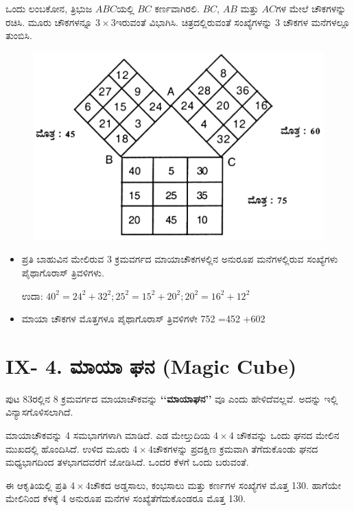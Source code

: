 ಒಂದು ಲಂಬಕೋನ, ತ್ರಿಭುಜ $ABC$ಯಲ್ಲಿ $BC$ ಕರ್ಣವಾಗಿರಲಿ. $BC$, $AB$ ಮತ್ತು $AC$ಗಳ ಮೇಲೆ ಚೌಕಗಳನ್ನು ರಚಿಸಿ. ಮೂರು ಚೌಕಗಳನ್ನೂ $3 \times 3$ಇರುವಂತೆ ವಿಭಾಗಿಸಿ. ಚಿತ್ರದಲ್ಲಿರುವಂತೆ ಸಂಖ್ಯೆಗಳನ್ನು 3 ಚೌಕಗಳ ಮನೆಗಳಲ್ಲೂ ತುಂಬಿಸಿ.
\begin{figure}[H]
\includegraphics{src/figures/chap8/fig8.10.jpg}
\end{figure}
\begin{itemize}
	\item ಪ್ರತಿ ಬಾಹುವಿನ ಮೇಲಿರುವ 3 ಕ್ರಮವರ್ಗದ ಮಾಯಾಚೌಕಗಳಲ್ಲಿನ ಅನುರೂಪ ಮನೆಗಳಲ್ಲಿರುವ ಸಂಖ್ಯೆಗಳು ಪೈಥಾಗೊರಾಸ್ ತ್ರಿವಳಿಗಳು.

	ಉದಾ: $40^2 = 24^2 +32^2 ; 25^2 =15^2 +20^2 ; 20^2 =16^2+12^2$
	\item ಮಾಯಾ ಚೌಕಗಳ ಮೊತ್ತಗಳೂ ಪೈಥಾಗೊರಾಸ್ ತ್ರಿವಳಿಗಳೇ 752 =452 +602
\end{itemize}

\section*{IX- 4. ಮಾಯಾ ಘನ (Magic Cube)}

ಪುಟ 83ರಲ್ಲಿನ 8 ಕ್ರಮವರ್ಗದ ಮಾಯಾಚೌಕವನ್ನು \textbf{‘‘ಮಾಯಾಘನ’’} ವೂ ಎಂದು ಹೇಳಿದೆವಲ್ಲವೆ. ಅದನ್ನು ಇಲ್ಲಿ ವಿನ್ಯಾಸಗೊಳಿಸಲಾಗಿದೆ.

ಮಾಯಾಚೌಕವನ್ನು 4 ಸಮಭಾಗಗಳಾಗಿ ಮಾಡಿದೆ. ಎಡ ಮೇಲ್ತುದಿಯ $4 \times 4$ ಚೌಕ\-ವನ್ನು ಒಂದು ಘನದ ಮೇಲಿನ ಮುಖದಲ್ಲಿ ಹೊಂದಿಸಿದೆ. ಉಳಿದ ಮೂರು $4 \times 4$\break ಚೌಕಗಳನ್ನು ಪ್ರದಕ್ಷಿಣ ಕ್ರಮವಾಗಿ ತೆಗೆದುಕೊಂಡು ಘನದ ಮಧ್ಯಭಾಗದಿಂದ ತಳಭಾಗದ\-ವರೆಗೆ ಜೋಡಿಸಿದೆ. ಒಂದರ ಕೆಳಗೆ ಒಂದು ಬರುವಂತೆ.

ಈ ಆಕೃತಿಯಲ್ಲಿ ಪ್ರತಿ $4 \times 4$ಚೌಕದ ಅಡ್ಡಸಾಲು, ಕಂಭಸಾಲು ಮತ್ತು ಕರ್ಣಗಳ ಸಂಖ್ಯೆಗಳ ಮೊತ್ತ 130. ಹಾಗೆಯೇ ಮೇಲಿನಿಂದ ಕೆಳಕ್ಕೆ 4 ಅನುರೂಪ ಮನೆಗಳ ಸಂಖ್ಯೆತೆಗೆದು\-ಕೊಂಡರೂ ಮೊತ್ತ 130.

